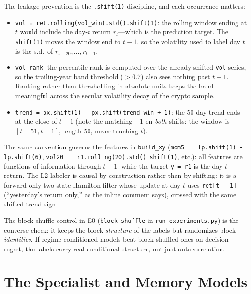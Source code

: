 \documentclass[11pt,a4paper]{article}
\theoremstyle{definition}
\theoremstyle{plain}
\begin{document}
The leakage prevention is the \texttt{.shift(1)} discipline, and each
occurrence matters:
\begin{itemize}
  \item \texttt{vol = ret.rolling(vol\_win).std().shift(1)}: the rolling
        window ending at $t$ would include the day-$t$ return $r_t$---which
        is the prediction target. The \texttt{shift(1)} moves the window end
        to $t-1$, so the volatility used to label day $t$ is the s.d.\ of
        $r_{t-20}, \dots, r_{t-1}$.
  \item \texttt{vol\_rank}: the percentile rank is computed over the
        already-shifted \texttt{vol} series, so the trailing-year band
        threshold ($>0.7$) also sees nothing past $t-1$. Ranking rather
        than thresholding in absolute units keeps the band meaningful across
        the secular volatility decay of the crypto sample.
  \item \texttt{trend = px.shift(1) - px.shift(trend\_win + 1)}: the 50-day
        trend ends at the close of $t-1$ (note the matching $+1$ on
        \emph{both} shifts: the window is $[t-51, t-1]$, length 50, never
        touching $t$).
\end{itemize}
The same convention governs the features in \texttt{build\_xy}
(\texttt{mom5} $=$ \texttt{lp.shift(1) - lp.shift(6)}, \texttt{vol20} $=$
\texttt{r1.rolling(20).std().shift(1)}, etc.): all features are functions of
information through $t-1$, while the target \texttt{y = r1} is the day-$t$
return. The L2 labeler is causal by construction rather than by shifting: it
is a forward-only two-state Hamilton filter whose update at day $t$ uses
\texttt{ret[t - 1]} (``yesterday's return only,'' as the inline comment
says), crossed with the same shifted trend sign.

\begin{intuition}
The block-shuffle control in E0 (\texttt{block\_shuffle} in
\texttt{run\_experiments.py}) is the converse check: it keeps the block
\emph{structure} of the labels but randomizes block \emph{identities}. If
regime-conditioned models beat block-shuffled ones on decision regret, the
labels carry real conditional structure, not just autocorrelation.
\end{intuition}


\section{The Specialist and Memory Models}
\label{sec:dd6-specialist}
\end{document}
